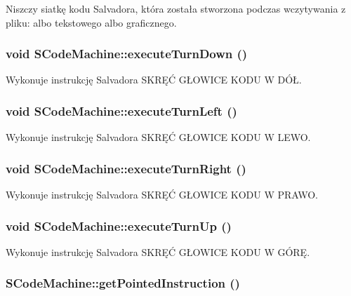 Niszczy siatkę kodu Salvadora, która została stworzona podczas wczytywania z pliku: albo tekstowego albo graficznego. \hypertarget{classSCodeMachine_26b7ba8981d08d594b0c37617aa85277}{
\subsubsection[{executeTurnDown}]{\setlength{\rightskip}{0pt plus 5cm}void SCodeMachine::executeTurnDown ()}}
\label{classSCodeMachine_26b7ba8981d08d594b0c37617aa85277}


Wykonuje instrukcję Salvadora SKRĘĆ GŁOWICE KODU W DÓŁ. \hypertarget{classSCodeMachine_d8415a221140a08a9383a595336cdf69}{
\subsubsection[{executeTurnLeft}]{\setlength{\rightskip}{0pt plus 5cm}void SCodeMachine::executeTurnLeft ()}}
\label{classSCodeMachine_d8415a221140a08a9383a595336cdf69}


Wykonuje instrukcję Salvadora SKRĘĆ GŁOWICE KODU W LEWO. \hypertarget{classSCodeMachine_d48065e7bf42eef9e3a0f81fbb17f301}{
\subsubsection[{executeTurnRight}]{\setlength{\rightskip}{0pt plus 5cm}void SCodeMachine::executeTurnRight ()}}
\label{classSCodeMachine_d48065e7bf42eef9e3a0f81fbb17f301}


Wykonuje instrukcję Salvadora SKRĘĆ GŁOWICE KODU W PRAWO. \hypertarget{classSCodeMachine_f2867d02414db096844e4801f9895650}{
\subsubsection[{executeTurnUp}]{\setlength{\rightskip}{0pt plus 5cm}void SCodeMachine::executeTurnUp ()}}
\label{classSCodeMachine_f2867d02414db096844e4801f9895650}


Wykonuje instrukcję Salvadora SKRĘĆ GŁOWICE KODU W GÓRĘ. \hypertarget{classSCodeMachine_3c851e80ec35cbebeb78ec8ceed8c5ca}{
\subsubsection[{getPointedInstruction}]{ SCodeMachine::getPointedInstruction ()}}
\label{classSCodeMachine_3c851e80ec35cbebeb78ec8ceed8c5ca}


